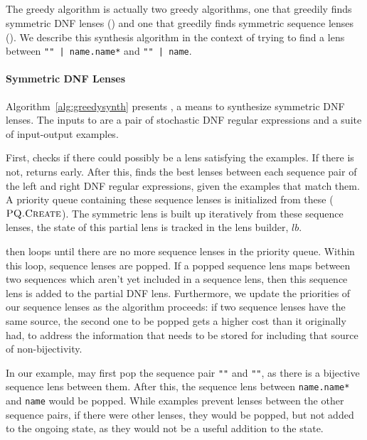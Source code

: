 \documentclass[acmsmall,screen,anonymous]{acmart}
\begin{document}
\subsection{\GreedySynth}
\label{subsec:greedy-synth}
The greedy algorithm is actually two greedy algorithms, one that greedily finds
symmetric DNF lenses (\GreedySynth) and one that greedily finds symmetric
sequence lenses (\GreedySeqSynth). We describe this synthesis algorithm in the
context of trying to find a lens between \lstinline{"" | name.name*} and
\lstinline{"" | name}.

\paragraph*{Symmetric DNF Lenses} Algorithm~\ref{alg:greedysynth} presents
\GreedySynth, a means to synthesize symmetric DNF lenses. The inputs to
\GreedySynth are a pair of stochastic DNF regular expressions and a suite of
input-output examples.

First,  checks if there could possibly be a lens satisfying the
examples. If there is not, \GreedySynth returns \None early. After this,
\GreedySynth finds the best lenses between each sequence pair of the left and
right DNF regular expressions, given the examples that match them. A priority
queue containing these sequence lenses is initialized from these
($\PCF{PQ.Create}$). The symmetric lens is built up iteratively from these
sequence lenses, the state of this partial lens is tracked in the lens builder,
$lb$.

\GreedySynth then loops until there are no more sequence lenses in the priority
queue. Within this loop, sequence lenses are popped. If a popped sequence lens
maps between two sequences which aren't yet included in a sequence lens, then
this sequence lens is added to the partial DNF lens. Furthermore, we update the
priorities of our sequence lenses as the algorithm proceeds: if two sequence
lenses have the same source, the second one to be popped gets a higher cost than
it originally had, to address the information that needs to be stored for
including that source of non-bijectivity.

In our example, \GreedySynth may first pop the sequence pair \lstinline{""} and
\lstinline{""}, as there is a bijective sequence lens between them. After this,
the sequence lens between \lstinline{name.name*} and \lstinline{name} would be
popped. While examples prevent lenses between the other sequence pairs, if there
were other lenses, they would be popped, but not added to the ongoing state, as
they would not be a useful addition to the state.
\end{document}

